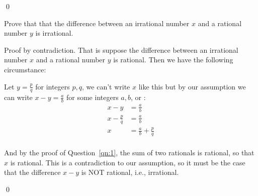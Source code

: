 \documentclass[addpoints,answers]{exam}
\begin{document}
\begin{questions}
\begin{solution}
    \qed
  \end{solution}




  \question[5] Prove that that the difference between an irrational number $x$ and a rational number $y$ is irrational.
  \vspace*{\fill}
  \begin{solution}
    Proof by contradiction. That is suppose the difference between an irrational number $x$ and a rational number $y$ is rational. Then we have the following circumstance:

    Let $y = \frac pq$ for integers $p,q$, we can't write $x$ like this but by our assumption we can write $x-y = \frac ab$ for some integers $a,b$, or :
    \begin{align*}
      x - y &= \frac ab\\
      x - \frac pq &= \frac ab\\
      x &= \frac ab + \frac pq\\
    \end{align*}

    And by the proof of Question~\ref{qn:1}, the sum of two rationals is rational, so that $x$ is rational. This is a contradiction to our assumption, so it must be the case that the difference $x-y$ is NOT rational, i.e., irrational.

    \qed
  \end{solution}


\end{questions}
\end{document}

